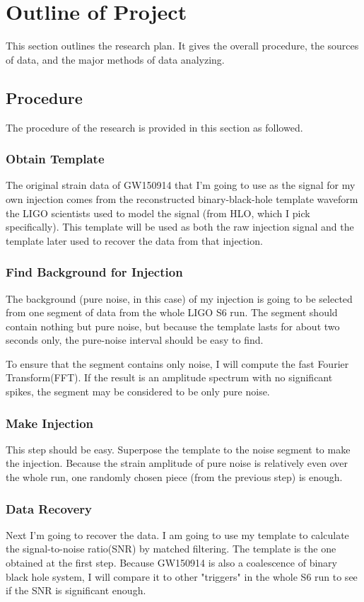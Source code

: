 \documentclass[aps,prl,preprint]{revtex4}
\begin{document}
\section{Outline of Project}
This section outlines the research plan. It gives the overall procedure, the sources of data, and the major methods of data analyzing.

\subsection{Procedure}
The procedure of the research is provided in this section as followed.
\subsubsection{Obtain Template}
The original strain data of GW150914 that I'm going to use as the signal for my own injection comes from the reconstructed binary-black-hole template waveform the LIGO scientists used to model the signal\cite{GWHLO} (from HLO, which I pick specifically). This template will be used as both the raw injection signal and the template later used to recover the data from that injection.
\subsubsection{Find Background for Injection}
The background (pure noise, in this case) of my injection is going to be selected from one segment of data from the whole LIGO S6 run. The segment should contain nothing but pure noise, but because the template lasts for about two seconds only, the pure-noise interval should be easy to find.
\par To ensure that the segment contains only noise, I will compute the fast Fourier Transform(FFT)\cite{FFT}. If the result is an amplitude spectrum with no significant spikes, the segment may be considered to be only pure noise.
\subsubsection{Make Injection}
This step should be easy. Superpose the template to the noise segment to make the injection. Because the strain amplitude of pure noise is relatively even over the whole run, one randomly chosen piece (from the previous step) is enough.
\subsubsection{Data Recovery}
Next I'm going to recover the data. I am going to use my template to calculate the signal-to-noise ratio(SNR)\cite{SNR} by matched filtering. The template is the one obtained at the first step. Because GW150914 is also a coalescence of binary black hole system\cite{GW}, I will compare it to other "triggers"\cite{S6himass} in the whole S6 run to see if the SNR is significant enough.
\end{document}
